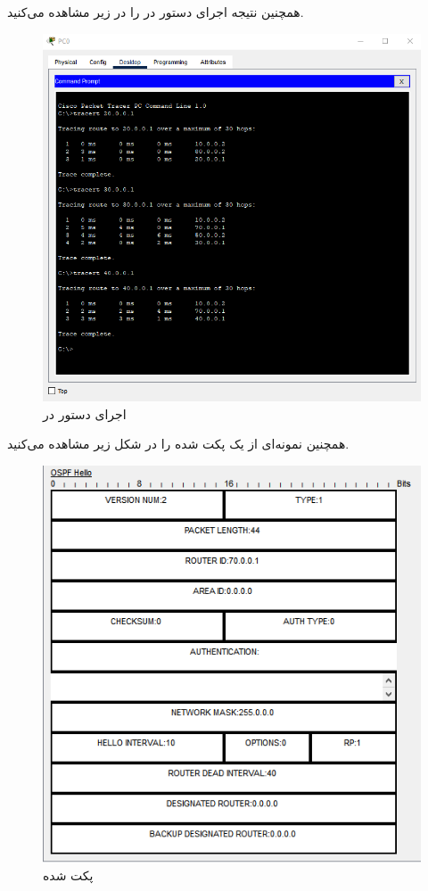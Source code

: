 \documentclass[12pt]{article}
\begin{document}
همچنین نتیجه اجرای دستور  در  را در زیر مشاهده می‌کنید.

\begin{figure}[H]
	\centering
	\includegraphics[scale=0.4]{images/ospf/14.png}
	\caption{اجرای دستور  در } 
	\label{ospftracert}
\end{figure}

همچنین نمونه‌ای از یک پکت  شده  را در شکل زیر مشاهده می‌کنید.

\begin{figure}[H]
	\centering
	\includegraphics[scale=0.4]{images/ospf/11.png}
	\caption{پکت  شده } 
	\label{ospfsniff}
\end{figure}
\end{document}
